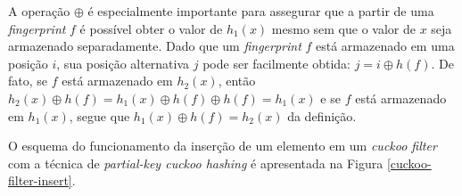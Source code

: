 \documentclass[12pt,twoside,english,brazilian]{book}
\begin{document}
A operação $\oplus$ é especialmente importante para assegurar que a partir de uma \textit{fingerprint} $f$ é possível obter o valor de $h_1(x)$ mesmo sem que o valor de $x$ seja armazenado separadamente. Dado que um \textit{fingerprint} $f$ está armazenado em uma posição $i$, sua posição alternativa $j$ pode ser facilmente obtida: $j = i \oplus h(f)$. De fato, se $f$ está armazenado em $h_2(x)$, então $h_2(x) \oplus h(f) = h_1(x) \oplus h(f) \oplus h(f) = h_1(x)$ e se $f$ está armazenado em $h_1(x)$, segue que $h_1(x) \oplus h(f) = h_2(x)$ da definição.

O esquema do funcionamento da inserção de um elemento em um \textit{cuckoo filter} com a técnica de \textit{partial-key cuckoo hashing} é apresentada na Figura \ref{cuckoo-filter-insert}.

\begin{figure}
    \begin{center}
\end{center}
\end{figure}
\end{document}
